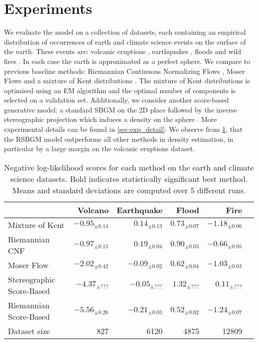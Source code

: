 \section{Experiments}
\label{sec:experiments}

We evaluate the model on a collection of datasets, each containing an empirical distribution of occurrences of earth and climate science events on the surface of the earth. These events are: volcanic eruptions \cite{volcanoe_dataset}, earthquakes \cite{earthquake_dataset}, floods \citep{flood_dataset} and wild fires \citep{fire_dataset}. In each case the earth is approximated as a perfect sphere. We compare to previous baseline methods: Riemannian Continuous Normalizing Flows \citep{mathieu2020riemannian}, Moser Flows \citep{rozen2021moser} and a mixture of Kent distributions \citep{peel2001fitting}. The mixture of Kent distributions is optimised using an EM algorithm and the optimal number of components is selected on a validation set.
Additionally, we consider another score-based generative model: a standard SBGM on the 2D place followed by the inverse stereographic projection which induces a density on the sphere \citep{gemici2016normalizing}.
More experimental details can be found in \cref{sec:exp_detail}.
We observe from \cref{tab:geoscience}, that the RSBGM model outperforms all other methods in density estimation, in particular by a large margin on the volcanic eruptions dataset.

\begin{table}[h]
    \centering
    \begin{tabular}{lrrrrr}
     & \textbf{Volcano} & \textbf{Earthquake} & \textbf{Flood} & \textbf{Fire} \\
    \midrule
    Mixture of Kent & $-0.95_{\pm 0.14}$ & $0.14_{\pm 0.13}$ & $0.73_{\pm 0.07}$ & $-1.18_{\pm 0.06}$ \\
    Riemannian CNF & $-0.97_{\pm 0.15}$ & $0.19_{\pm0.04}$ & $0.90_{\pm0.03}$ & $-0.66_{\pm0.05}$ \\
    Moser Flow & $-2.02_{\pm 0.42}$ & $-0.09_{\pm0.02}$ & $0.62_{\pm 0.04}$ & $-1.03_{\pm 0.03}$ \\
    Stereographic Score-Based & ${-4.37}_{\pm ???}$ & ${-0.05}_{\pm ???}$ & ${1.32}_{\pm ???}$ & $0.11_{\pm ???}$ \\
    Riemannian Score-Based & $\bm{-5.56}_{\pm0.26}$ & $\bm{-0.21}_{\pm0.03}$ & $\bm{0.52}_{\pm0.02}$ & $\bm{-1.24}_{\pm 0.07}$\\
    \midrule 
    Dataset size & 827 & 6120 & 4875 & 12809 \\
    \bottomrule
    \end{tabular}
    \caption{
    Negative log-likelihood scores for each method on the earth and climate science datasets.
    Bold indicates statistically significant best method.
    Means and standard deviations are computed over 5 different runs.
    }
    \label{tab:geoscience}
\end{table}

